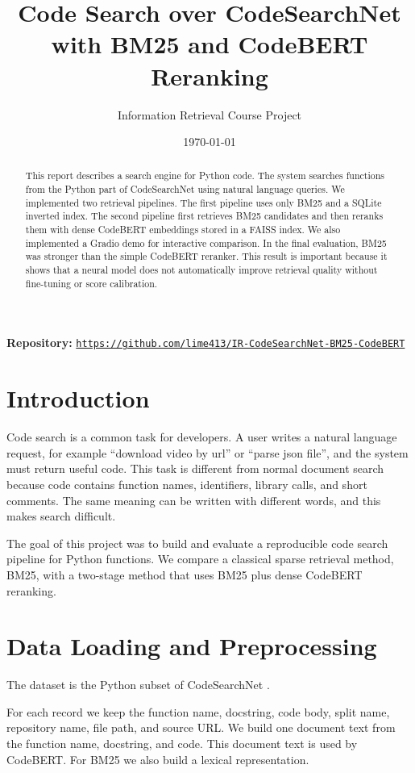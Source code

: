 \documentclass[11pt]{article}
\title{Code Search over CodeSearchNet with BM25 and CodeBERT Reranking}
\author{Information Retrieval Course Project}
\date{\today}
\begin{document}
\maketitle

\noindent\textbf{Repository:}
\href{https://github.com/lime413/IR-CodeSearchNet-BM25-CodeBERT}{\texttt{https://github.com/lime413/IR-CodeSearchNet-BM25-CodeBERT}}

\begin{abstract}
This report describes a search engine for Python code. The system searches
functions from the Python part of CodeSearchNet using natural language queries.
We implemented two retrieval pipelines. The first pipeline uses only BM25 and a
SQLite inverted index. The second pipeline first retrieves BM25 candidates and
then reranks them with dense CodeBERT embeddings stored in a FAISS index. We also
implemented a Gradio demo for interactive comparison. In the final evaluation,
BM25 was stronger than the simple CodeBERT reranker. This result is important
because it shows that a neural model does not automatically improve retrieval
quality without fine-tuning or score calibration.
\end{abstract}

\section{Introduction}

Code search is a common task for developers. A user writes a natural language
request, for example ``download video by url'' or ``parse json file'', and the
system must return useful code. This task is different from normal document
search because code contains function names, identifiers, library calls, and
short comments. The same meaning can be written with different words, and this
makes search difficult.

The goal of this project was to build and evaluate a reproducible code search
pipeline for Python functions. We compare a classical sparse retrieval method,
BM25, with a two-stage method that uses BM25 plus dense CodeBERT reranking.

\section{Data Loading and Preprocessing}

The dataset is the Python subset of CodeSearchNet \cite{codesearchnet}.

For each record we keep the function name, docstring, code body, split name,
repository name, file path, and source URL. We build one document text from the
function name, docstring, and code. This document text is used by CodeBERT. For
BM25 we also build a lexical representation.
\end{document}

